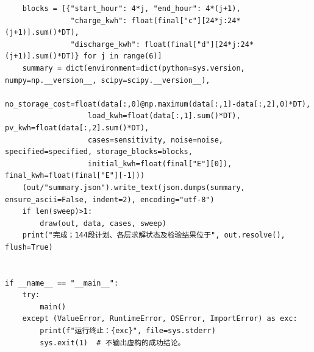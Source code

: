 \documentclass[withoutpreface,bwprint]{cumcmthesis}
\begin{document}
\begin{appendices}
\begin{lstlisting}
    blocks = [{"start_hour": 4*j, "end_hour": 4*(j+1),
               "charge_kwh": float(final["c"][24*j:24*(j+1)].sum()*DT),
               "discharge_kwh": float(final["d"][24*j:24*(j+1)].sum()*DT)} for j in range(6)]
    summary = dict(environment=dict(python=sys.version, numpy=np.__version__, scipy=scipy.__version__),
                   no_storage_cost=float(data[:,0]@np.maximum(data[:,1]-data[:,2],0)*DT),
                   load_kwh=float(data[:,1].sum()*DT), pv_kwh=float(data[:,2].sum()*DT),
                   cases=sensitivity, noise=noise, specified=specified, storage_blocks=blocks,
                   initial_kwh=float(final["E"][0]), final_kwh=float(final["E"][-1]))
    (out/"summary.json").write_text(json.dumps(summary, ensure_ascii=False, indent=2), encoding="utf-8")
    if len(sweep)>1:
        draw(out, data, cases, sweep)
    print("完成；144段计划、各层求解状态及检验结果位于", out.resolve(), flush=True)


if __name__ == "__main__":
    try:
        main()
    except (ValueError, RuntimeError, OSError, ImportError) as exc:
        print(f"运行终止：{exc}", file=sys.stderr)
        sys.exit(1)  # 不输出虚构的成功结论。
\end{lstlisting}

\endgroup
\end{appendices}
\end{document}
